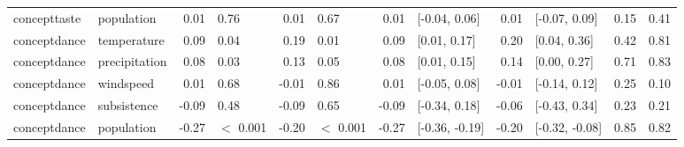 \begin{table}[ht]
\begin{tabular}{llrlrlrlrlrr}
  concepttaste & population & 0.01 & 0.76 & 0.01 & 0.67 & 0.01 & [-0.04, 0.06] & 0.01 & [-0.07, 0.09] & 0.15 & 0.41 \\ 
  conceptdance & temperature & 0.09 & 0.04 & 0.19 & 0.01 & 0.09 & [0.01, 0.17] & 0.20 & [0.04, 0.36] & 0.42 & 0.81 \\ 
  conceptdance & precipitation & 0.08 & 0.03 & 0.13 & 0.05 & 0.08 & [0.01, 0.15] & 0.14 & [0.00, 0.27] & 0.71 & 0.83 \\ 
  conceptdance & windspeed & 0.01 & 0.68 & -0.01 & 0.86 & 0.01 & [-0.05, 0.08] & -0.01 & [-0.14, 0.12] & 0.25 & 0.10 \\ 
  conceptdance & subsistence & -0.09 & 0.48 & -0.09 & 0.65 & -0.09 & [-0.34, 0.18] & -0.06 & [-0.43, 0.34] & 0.23 & 0.21 \\ 
  conceptdance & population & -0.27 & $<$ 0.001 & -0.20 & $<$ 0.001 & -0.27 & [-0.36, -0.19] & -0.20 & [-0.32, -0.08] & 0.85 & 0.82 \\ 
   \hline
\end{tabular}
\end{table}

